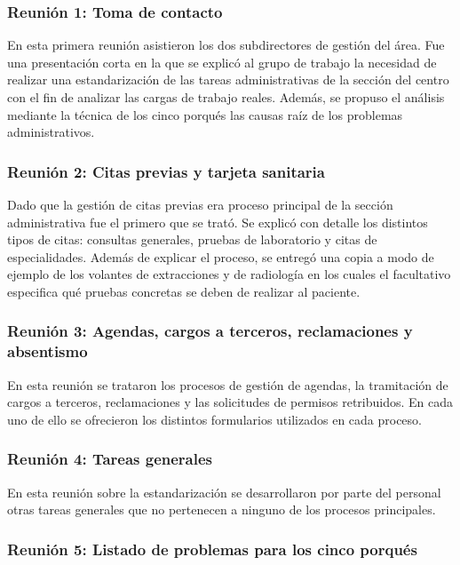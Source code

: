 \subsubsection{Reunión 1: Toma de contacto}

En esta primera reunión asistieron los dos subdirectores de gestión del área.
Fue una presentación corta en la que se explicó al grupo de trabajo la necesidad de realizar una estandarización de las tareas administrativas de la sección del centro con el fin de analizar las cargas de trabajo reales.
Además, se propuso el análisis mediante la técnica de los cinco porqués las causas raíz de los problemas administrativos.

\subsubsection{Reunión 2: Citas previas y tarjeta sanitaria}

Dado que la gestión de citas previas era proceso principal de la sección administrativa fue el primero que se trató.
Se explicó con detalle los distintos tipos de citas: consultas generales, pruebas de laboratorio y citas de especialidades.
Además de explicar el proceso, se entregó una copia a modo de ejemplo de los volantes de extracciones y de radiología en los cuales el facultativo especifica qué pruebas concretas se deben de realizar al paciente.

\subsubsection{Reunión 3: Agendas, cargos a terceros, reclamaciones y absentismo}

En esta reunión se trataron los procesos de gestión de agendas, la tramitación de cargos a terceros, reclamaciones y las solicitudes de permisos retribuidos.
En cada uno de ello se ofrecieron los distintos formularios utilizados en cada proceso.

\subsubsection{Reunión 4: Tareas generales}

En esta reunión sobre la estandarización se desarrollaron por parte del personal otras tareas generales que no pertenecen a ninguno de los procesos principales.

\subsubsection{Reunión 5: Listado de problemas para los cinco porqués}

